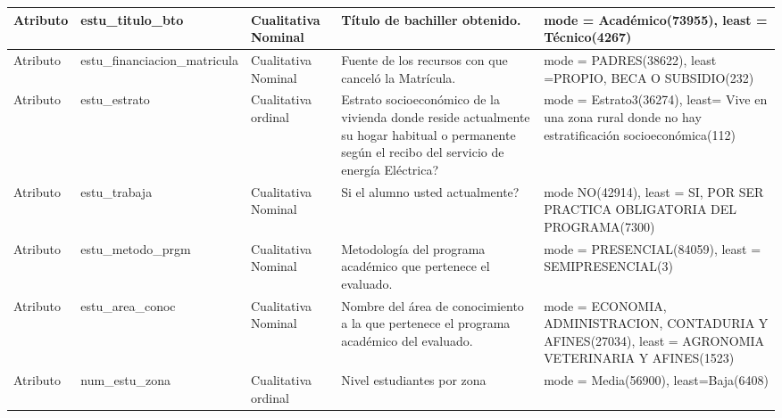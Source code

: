 \begin{table}[H]
\begin{flushleft}
\begin{tabular}{|>{\centering\arraybackslash}m{2cm}|>{\arraybackslash}m{4cm}|>{\arraybackslash}m{2cm}|>{\arraybackslash}m{3cm}|>{\arraybackslash}m{4cm}| }
    Atributo & estu\_titulo\_bto & Cualitativa Nominal & Título de bachiller obtenido. & mode = Académico(73955), least = Técnico(4267) \\ \hline
    Atributo & estu\_financiacion\_matricula & Cualitativa Nominal & Fuente de los recursos con que canceló la Matrícula. & mode = PADRES(38622), least =PROPIO, BECA O SUBSIDIO(232) \\ \hline
    Atributo & estu\_estrato & Cualitativa ordinal & Estrato socioeconómico de la vivienda donde reside actualmente
    su hogar habitual o permanente según el recibo del servicio de energía
    Eléctrica? & mode = Estrato3(36274), least=
    Vive en una zona rural donde no hay estratificación socioeconómica(112) \\ \hline
    Atributo & estu\_trabaja & Cualitativa Nominal & Si el alumno usted actualmente? & mode NO(42914), least = SI, POR SER PRACTICA OBLIGATORIA DEL PROGRAMA(7300) \\ \hline
    Atributo & estu\_metodo\_prgm & Cualitativa Nominal & Metodología del programa académico que pertenece el evaluado. & mode = PRESENCIAL(84059), least = SEMIPRESENCIAL(3) \\ \hline
    Atributo & estu\_area\_conoc & Cualitativa Nominal & Nombre del área de conocimiento a la que pertenece el programa académico del evaluado. & mode = ECONOMIA, ADMINISTRACION, CONTADURIA Y AFINES(27034),
    least = AGRONOMIA VETERINARIA Y AFINES(1523) \\ \hline
    Atributo & num\_estu\_zona & Cualitativa ordinal & Nivel estudiantes por zona  & mode = Media(56900), least=Baja(6408) \\ \hline
  \end{tabular}
\end{flushleft}
\label{}
\end{table}

